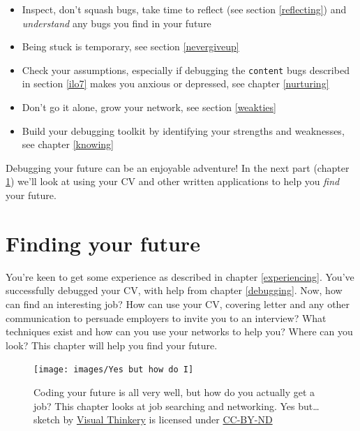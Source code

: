 \documentclass[
]{book}
\providecommand{\tightlist}{%
  \setlength{\itemsep}{0pt}\setlength{\parskip}{0pt}}
\begin{document}
\begin{itemize}
\tightlist
\item
  Inspect, don't squash bugs, take time to reflect (see section \ref{reflecting}) and \emph{understand} any bugs you find in your future
\item
  Being stuck is temporary, see section \ref{nevergiveup}
\item
  Check your assumptions, especially if debugging the \texttt{content} bugs described in section \ref{ilo7} makes you anxious or depressed, see chapter \ref{nurturing}
\item
  Don't go it alone, grow your network, see section \ref{weakties}
\item
  Build your debugging toolkit by identifying your strengths and weaknesses, see chapter \ref{knowing}
\end{itemize}

Debugging your future can be an enjoyable adventure! In the next part (chapter \ref{finding}) we'll look at using your CV and other written applications to help you \emph{find} your future.

\hypertarget{finding}{%
\chapter{Finding your future}\label{finding}}

You're keen to get some experience as described in chapter \ref{experiencing}. You've successfully debugged your CV, with help from chapter \ref{debugging}. Now, how can find an interesting job? How can use your CV, covering letter and any other communication to persuade employers to invite you to an interview? What techniques exist and how can you use your networks to help you? Where can you look? This chapter will help you find your future. 🔭

\begin{figure}

{\centering \texttt{[image: images/Yes but how do I]} 

}

\caption{Coding your future is all very well, but how do you actually get a job? This chapter looks at job searching and networking. Yes but\ldots{} sketch by \href{https://visualthinkery.com}{Visual Thinkery} is licensed under \href{https://creativecommons.org/licenses/by-nd/4.0/}{CC-BY-ND}}\label{fig:yesbut-fig}
\end{figure}
\end{document}
